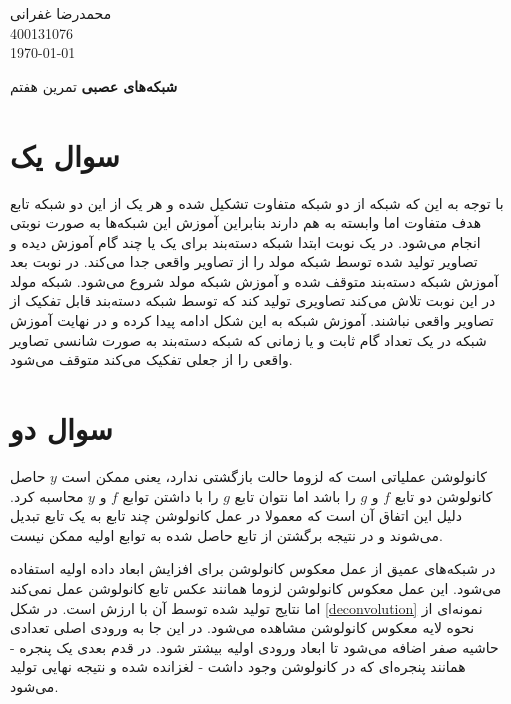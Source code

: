 \documentclass[12pt, a4paper]{book}
\newcommand{\coursetitle}{شبکه‌های عصبی}
\newcommand{\doctitle}{تمرین هفتم}
\newcommand{\name}{محمدرضا غفرانی}
\newcommand{\studentno}{400131076}
\newcommand{\todaydate}{\today}
\begin{document}
\begin{flushleft}
    \name \\
    \studentno \\
    \todaydate
\end{flushleft}

\begin{center}
    \huge
    \textbf{\coursetitle}
    \break
    \large
    \doctitle
\end{center}

\thispagestyle{plain}

\section*{سوال یک}

با توجه به این که شبکه  از دو شبکه متفاوت تشکیل شده و هر یک از این دو شبکه‌ تابع هدف متفاوت اما
وابسته به هم دارند بنابراین آموزش این شبکه‌ها به صورت نوبتی انجام می‌شود. در یک نوبت ابتدا شبکه دسته‌بند
برای یک یا چند گام آموزش دیده و تصاویر تولید شده توسط شبکه مولد را از تصاویر واقعی جدا می‌کند. در نوبت بعد
آموزش شبکه دسته‌بند متوقف شده و آموزش شبکه مولد شروع می‌شود. شبکه مولد در این نوبت تلاش می‌کند تصاویری تولید
کند که توسط شبکه دسته‌بند قابل تفکیک از تصاویر واقعی نباشند. آموزش شبکه به این شکل ادامه پیدا کرده و در نهایت
آموزش شبکه در یک تعداد گام ثابت و یا زمانی که شبکه دسته‌بند به صورت شانسی تصاویر واقعی را از جعلی تفکیک می‌کند
متوقف می‌شود.

\section*{سوال دو}

کانولوشن عملیاتی است که لزوما حالت بازگشتی ندارد، یعنی ممکن است $y$ حاصل کانولوشن دو تابع $f$ و $g$ را باشد اما
نتوان تابع $g$ را با داشتن توابع $f$ و $y$ محاسبه کرد. دلیل این اتفاق آن است که معمولا در عمل کانولوشن چند تابع
به یک تابع تبدیل می‌شوند و در نتیجه برگشتن از تابع حاصل شده به توابع اولیه ممکن نیست.

در شبکه‌های عمیق از عمل معکوس کانولوشن برای افزایش ابعاد داده اولیه استفاده می‌شود. این عمل معکوس کانولوشن
لزوما همانند عکس تابع کانولوشن عمل نمی‌کند اما نتایج تولید شده توسط آن با ارزش است. در شکل \ref{deconvolution}
نمونه‌ای از نحوه لایه معکوس کانولوشن مشاهده می‌شود. در این جا به ورودی اصلی تعدادی حاشیه صفر اضافه می‌شود تا ابعاد
ورودی اولیه بیشتر شود. در قدم بعدی یک پنجره - همانند پنجره‌ای که در کانولوشن وجود داشت - لغزانده شده و نتیجه
نهایی تولید می‌شود.
\end{document}
